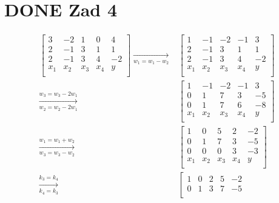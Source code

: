 \documentclass[11pt]{article}
\begin{document}
\section{{\bfseries\sffamily DONE} Zad 4}
\label{sec:orgae0d76d}
\begin{align*}
  \left[
  \begin{array}{cccc|c}
    3  & -2 & 1 & 0 & 4\\
    2  & -1 & 3 & 1 & 1 \\
    2 & -1 & 3 & 4  & -2\\
    x_1 & x_2 & x_3 & x_4  & y\\
  \end{array}
  \right]
  \xrightarrow[w_{1} = w_{1} - w_{2}]{}
       & \left[
         \begin{array}{cccc|c}
           1  & -1 & -2 & -1 & 3\\
           2  & -1 & 3 & 1 & 1 \\
           2 & -1 & 3 & 4  & -2\\
           x_1 & x_2 & x_3 & x_4  & y\\
         \end{array}
  \right]
  \\
  \xrightarrow[w_{2} = w_{2} - 2 w_{1} ]{w_3 = w_3 - 2 w_1}
       & \left[
         \begin{array}{cccc|c}
           1  & -1 & -2 & -1 & 3\\
           0  & 1 & 7 & 3 & -5 \\
           0 & 1 & 7  & 6 & -8 \\
           x_1 & x_2 & x_3 & x_4  & y\\
         \end{array}
  \right]
  \\
  \xrightarrow[w_{3} = w_{3} - w_{2}]{w_{1} = w_{1} + w_{2}}
       &\left[
         \begin{array}{cccc|c}
           1 & 0 & 5 & 2 & -2\\
           0 & 1 & 7 & 3 & -5\\
           0 & 0 & 0 & 3 & -3\\
           x_1 & x_2 & x_3 & x_4  & y\\
         \end{array}
  \right]
  \\
  \xrightarrow[k_{4} = k_{3}]{k_{3} = k_{4}}
       &\left[
         \begin{array}{cccc|c}
           1 & 0 & 2 & 5 & -2\\
           0 & 1 & 3 & 7 & -5\\

\end{array}
\end{align*}
\end{document}
